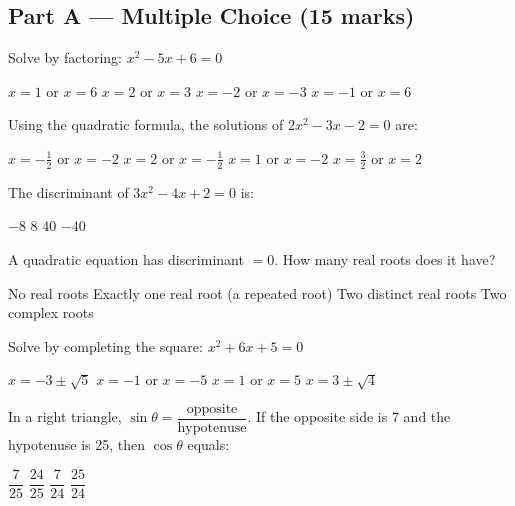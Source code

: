 \documentclass[addpoints]{exam}
\begin{document}
\newpage
\begin{questions}

\section*{Part A --- Multiple Choice (15 marks)}
\vspace{5mm}

\question[1] Solve by factoring: $x^2 - 5x + 6 = 0$
\begin{choices}
    \choice $x = 1$ or $x = 6$
    \correctchoice $x = 2$ or $x = 3$
    \choice $x = -2$ or $x = -3$
    \choice $x = -1$ or $x = 6$
\end{choices}
\vspace{3mm}

\question[1] Using the quadratic formula, the solutions of $2x^2 - 3x - 2 = 0$ are:
\begin{choices}
    \choice $x = -\tfrac{1}{2}$ or $x = -2$
    \correctchoice $x = 2$ or $x = -\tfrac{1}{2}$
    \choice $x = 1$ or $x = -2$
    \choice $x = \tfrac{3}{2}$ or $x = 2$
\end{choices}
\vspace{3mm}

\question[1] The discriminant of $3x^2 - 4x + 2 = 0$ is:
\begin{choices}
    \correctchoice $-8$
    \choice $8$
    \choice $40$
    \choice $-40$
\end{choices}
\vspace{3mm}

\question[1] A quadratic equation has discriminant $= 0$. How many real roots does it have?
\begin{choices}
    \choice No real roots
    \correctchoice Exactly one real root (a repeated root)
    \choice Two distinct real roots
    \choice Two complex roots
\end{choices}
\vspace{3mm}

\question[1] Solve by completing the square: $x^2 + 6x + 5 = 0$
\begin{choices}
    \choice $x = -3 \pm \sqrt{5}$
    \correctchoice $x = -1$ or $x = -5$
    \choice $x = 1$ or $x = 5$
    \choice $x = 3 \pm \sqrt{4}$
\end{choices}
\vspace{3mm}

\question[1] In a right triangle, $\sin\theta = \dfrac{\text{opposite}}{\text{hypotenuse}}$. If the opposite side is 7 and the hypotenuse is 25, then $\cos\theta$ equals:
\begin{choices}
    \choice $\dfrac{7}{25}$
    \correctchoice $\dfrac{24}{25}$
    \choice $\dfrac{7}{24}$
    \choice $\dfrac{25}{24}$
\end{choices}
\vspace{3mm}


\end{questions}
\end{document}
